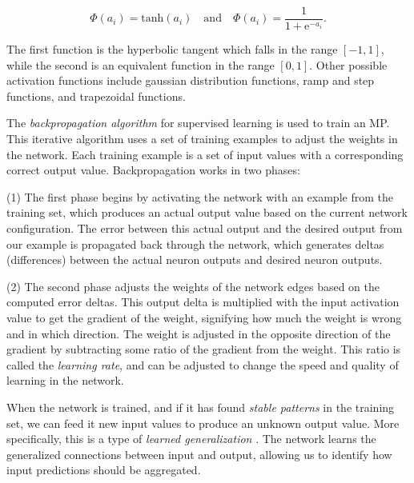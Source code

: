 \begin{equation*}
  \Phi(a_i) = \mathrm{tanh}(a_i) \quad \text{and} \quad \Phi(a_i) = \frac{1}{1 + \mathrm{e}^{-a_i}}.
\end{equation*}

The first function is the hyperbolic tangent which falls in the range $[-1,1]$,
while the second is an equivalent function in the range $[0,1]$.
Other possible activation functions include
gaussian distribution functions, ramp and step functions, and trapezoidal
functions.

The \emph{backpropagation algorithm} for supervised learning \cite[p578]{Russell1995}
is used to train an MP.
This iterative algorithm uses a set of training examples to adjust the weights in 
the network. Each training example is a set of input values with a corresponding correct output value.
Backpropagation works in two phases:

(1) The first phase begins by activating the network with an example from the training set,
which produces an actual output value based on the current network configuration.
The error between this actual output and the desired output from our example
is propagated back through the network, which generates deltas (differences)
between the actual neuron outputs and desired neuron outputs.

(2) The second phase adjusts the weights of the network edges based on the computed error deltas.
This output delta is multiplied with the input activation value to get the gradient of the weight,
signifying how much the weight is wrong and in which direction.
The weight is adjusted in the opposite direction of the gradient by subtracting some ratio
of the gradient from the weight. 
This ratio is called the \emph{learning rate},
and can be adjusted to change the speed and quality of learning in the network.

When the network is trained, and if it has found \emph{stable patterns} in the training set,
we can feed it new input values to produce an unknown output value.
More specifically, this is a type of \emph{learned generalization} \cite[p177]{Floreano2008}.
The network learns the generalized connections between input and output,
allowing us to identify how input predictions should be aggregated.


